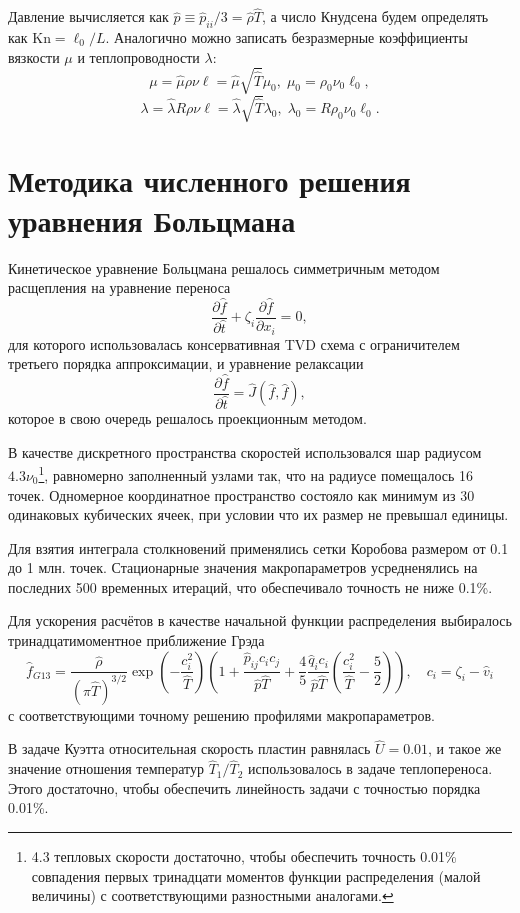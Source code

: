 \documentclass[a4paper,12pt]{article}
\newcommand{\Kn}{\mathrm{Kn}}
\begin{document}
Давление вычисляется как \(\hat{p} \equiv \hat{p}_{ii}/3 = \hat{\rho}\hat{T}\), а число Кнудсена будем определять как \(\Kn=\ell_0/L\).
Аналогично можно записать безразмерные коэффициенты вязкости \(\mu\) и теплопроводности \(\lambda\):
\[ \mu = \hat{\mu}\rho\nu\ell = \hat{\mu}\sqrt{\hat{T}}\mu_0, \; \mu_0 = \rho_0\nu_0\ell_0, \]
\[ \lambda = \hat{\lambda}R\rho\nu\ell = \hat{\lambda}\sqrt{\hat{T}}\lambda_0, \; \lambda_0 = R\rho_0\nu_0\ell_0. \]
 
\section{Методика численного решения уравнения Больцмана}

Кинетическое уравнение Больцмана решалось симметричным методом расщепления на уравнение переноса
\[ \frac{\partial\hat{f}}{\partial\hat{t}} + \zeta_i\frac{\partial\hat{f}}{\partial x_i} = 0, \]
для которого использовалась консервативная TVD схема с ограничителем третьего порядка аппроксимации,
и уравнение релаксации
\[ \frac{\partial\hat{f}}{\partial\hat{t}} = \hat{J}(\hat{f},\hat{f}), \]
которое в свою очередь решалось проекционным методом.

В качестве дискретного пространства скоростей использовался шар радиусом \(4.3\nu_0\)\footnote
{
	4.3 тепловых скорости достаточно, чтобы обеспечить точность 0.01\% совпадения
	первых тринадцати моментов функции распределения (малой величины) с соответствующими разностными аналогами.
},
равномерно заполненный узлами так, что на радиусе помещалось 16 точек.
Одномерное координатное пространство состояло как минимум из 30 одинаковых кубических ячеек,
при условии что их размер не превышал единицы.

Для взятия интеграла столкновений применялись сетки Коробова размером от 0.1 до 1 млн. точек.
Стационарные значения макропараметров усредненялись на последних 500 временных итераций,
что обеспечивало точность не ниже 0.1\%.

Для ускорения расчётов в качестве начальной функции распределения выбиралось тринадцатимоментное приближение Грэда
\[ 
	\hat{f}_{G13} = \frac{\hat\rho}{(\pi\hat T)^{3/2}}\exp\left(-\frac{c_i^2}{\hat T}\right)
	\left( 1+\frac{\hat p_{ij}c_ic_j}{\hat p\hat T} + \frac4{5}\frac{\hat q_ic_i}{\hat p\hat T}\left(\frac{c_i^2}{\hat T}-\frac5{2}\right) \right),
	\quad c_i = \zeta_i - \hat v_i
\]
с соответствующими точному решению профилями макропараметров.

В задаче Куэтта относительная скорость пластин равнялась \(\hat{U}=0.01\),
и такое же значение отношения температур \(\hat{T}_1/\hat{T}_2\) использовалось в задаче теплопереноса.
Этого достаточно, чтобы обеспечить линейность задачи с точностью порядка 0.01\%.
\end{document}

